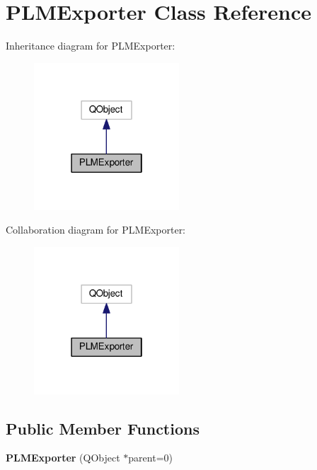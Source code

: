 \hypertarget{class_p_l_m_exporter}{}\section{P\+L\+M\+Exporter Class Reference}
\label{class_p_l_m_exporter}


Inheritance diagram for P\+L\+M\+Exporter\+:\nopagebreak
\begin{figure}[H]
\begin{center}
\leavevmode
\includegraphics[width=154pt]{class_p_l_m_exporter__inherit__graph}
\end{center}
\end{figure}


Collaboration diagram for P\+L\+M\+Exporter\+:\nopagebreak
\begin{figure}[H]
\begin{center}
\leavevmode
\includegraphics[width=154pt]{class_p_l_m_exporter__coll__graph}
\end{center}
\end{figure}
\subsection*{Public Member Functions}
\begin{DoxyCompactItemize}
\item 
{\bfseries P\+L\+M\+Exporter} (Q\+Object $\ast$parent=0)\hypertarget{class_p_l_m_exporter_ae43f6456a8e870c309704bbd78d7c6ca}{}\label{class_p_l_m_exporter_ae43f6456a8e870c309704bbd78d7c6ca}

\end{DoxyCompactItemize}
